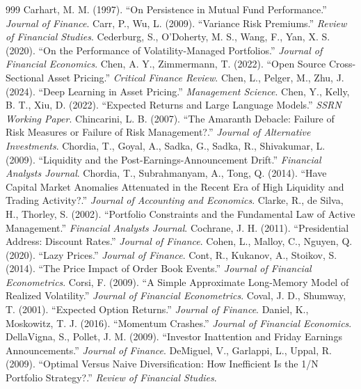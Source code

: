 \begin{thebibliography}{999}
 Carhart, M. M. (1997). ``On Persistence in Mutual Fund Performance.'' \textit{Journal of Finance}.
 Carr, P., Wu, L. (2009). ``Variance Risk Premiums.'' \textit{Review of Financial Studies}.
 Cederburg, S., O'Doherty, M. S., Wang, F., Yan, X. S. (2020). ``On the Performance of Volatility-Managed Portfolios.'' \textit{Journal of Financial Economics}.
 Chen, A. Y., Zimmermann, T. (2022). ``Open Source Cross-Sectional Asset Pricing.'' \textit{Critical Finance Review}.
 Chen, L., Pelger, M., Zhu, J. (2024). ``Deep Learning in Asset Pricing.'' \textit{Management Science}.
 Chen, Y., Kelly, B. T., Xiu, D. (2022). ``Expected Returns and Large Language Models.'' \textit{SSRN Working Paper}.
 Chincarini, L. B. (2007). ``The Amaranth Debacle: Failure of Risk Measures or Failure of Risk Management?.'' \textit{Journal of Alternative Investments}.
 Chordia, T., Goyal, A., Sadka, G., Sadka, R., Shivakumar, L. (2009). ``Liquidity and the Post-Earnings-Announcement Drift.'' \textit{Financial Analysts Journal}.
 Chordia, T., Subrahmanyam, A., Tong, Q. (2014). ``Have Capital Market Anomalies Attenuated in the Recent Era of High Liquidity and Trading Activity?.'' \textit{Journal of Accounting and Economics}.
 Clarke, R., de Silva, H., Thorley, S. (2002). ``Portfolio Constraints and the Fundamental Law of Active Management.'' \textit{Financial Analysts Journal}.
 Cochrane, J. H. (2011). ``Presidential Address: Discount Rates.'' \textit{Journal of Finance}.
 Cohen, L., Malloy, C., Nguyen, Q. (2020). ``Lazy Prices.'' \textit{Journal of Finance}.
 Cont, R., Kukanov, A., Stoikov, S. (2014). ``The Price Impact of Order Book Events.'' \textit{Journal of Financial Econometrics}.
 Corsi, F. (2009). ``A Simple Approximate Long-Memory Model of Realized Volatility.'' \textit{Journal of Financial Econometrics}.
 Coval, J. D., Shumway, T. (2001). ``Expected Option Returns.'' \textit{Journal of Finance}.
 Daniel, K., Moskowitz, T. J. (2016). ``Momentum Crashes.'' \textit{Journal of Financial Economics}.
 DellaVigna, S., Pollet, J. M. (2009). ``Investor Inattention and Friday Earnings Announcements.'' \textit{Journal of Finance}.
 DeMiguel, V., Garlappi, L., Uppal, R. (2009). ``Optimal Versus Naive Diversification: How Inefficient Is the 1/N Portfolio Strategy?.'' \textit{Review of Financial Studies}.

\end{thebibliography}
